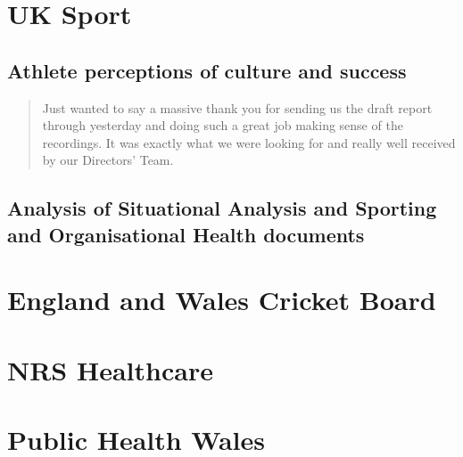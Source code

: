 \documentclass[
  12pt,
  a4paper,
]{book}
\begin{document}
\hypertarget{uk-sport}{%
\section{UK Sport}\label{uk-sport}}

\hypertarget{athlete-perceptions-of-culture-and-success}{%
\subsection{Athlete perceptions of culture and success}\label{athlete-perceptions-of-culture-and-success}}

\begin{quote}
Just wanted to say a massive thank you for sending us the draft report through yesterday and doing such a great job making sense of the recordings. It was exactly what we were looking for and really well received by our Directors' Team.
\end{quote}

\hypertarget{analysis-of-situational-analysis-and-sporting-and-organisational-health-documents}{%
\subsection{Analysis of Situational Analysis and Sporting and Organisational Health documents}\label{analysis-of-situational-analysis-and-sporting-and-organisational-health-documents}}


\hypertarget{england-and-wales-cricket-board}{%
\section{England and Wales Cricket Board}\label{england-and-wales-cricket-board}}

\hypertarget{nrs-healthcare}{%
\section{NRS Healthcare}\label{nrs-healthcare}}

\hypertarget{public-health-wales}{%
\section{Public Health Wales}\label{public-health-wales}}
\end{document}
